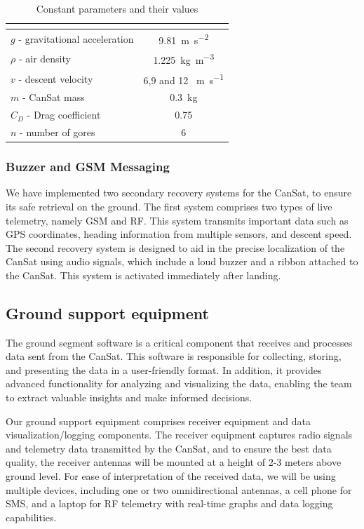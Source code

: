 \documentclass[11pt]{article}
\begin{document}
\begin{table}[htbp]
\centering
{}
\begin{tabular}{>{\centering\arraybackslash}lc}
\rowcolor{CDOSRPrimary}
\hline
\multicolumn{1}{|c|}{\textbf{\color{white!50}{Parameter}}}  & \textbf{\color{white!50}{Value}} \\
\hline
$g$ - gravitational acceleration & \SI{9.81 }{\meter\per\square\second} \\
\rowcolor{LightCyan1!50}$\rho$ - air density & \SI{1.225}{\kilogram\per\cubic\metre} \\
$v$ - descent velocity & 6,9 and 12 \SI{}{\meter\per\second} \\
\rowcolor{LightCyan1!50}$m$ - CanSat mass & \SI{0.3}{\kilogram} \\
$C_D$ - Drag coefficient & 0.75 \\
\rowcolor{LightCyan1!50}$n$ - number of gores & 6 \\
\hline
\end{tabular}
\caption{Constant parameters and their values}
\end{table}

\subsubsection{Buzzer and GSM Messaging}
We have implemented two secondary recovery systems for the CanSat, to ensure its safe retrieval on the ground. The first system comprises two types of live telemetry, namely GSM and RF. This system transmits important data such as GPS coordinates, heading information from multiple sensors, and descent speed. The second recovery system is designed to aid in the precise localization of the CanSat using audio signals, which include a loud buzzer and a ribbon attached to the CanSat. This system is activated immediately after landing.

\subsection{Ground support equipment}
The ground segment software is a critical component that receives and processes data sent from the CanSat. This software is responsible for collecting, storing, and presenting the data in a user-friendly format. In addition, it provides advanced functionality for analyzing and visualizing the data, enabling the team to extract valuable insights and make informed decisions.

Our ground support equipment comprises receiver equipment and data visualization/logging components. The receiver equipment captures radio signals and telemetry data transmitted by the CanSat, and to ensure the best data quality, the receiver antennas will be mounted at a height of 2-3 meters above ground level. For ease of interpretation of the received data, we will be using multiple devices, including one or two omnidirectional antennas, a cell phone for SMS, and a laptop for RF telemetry with real-time graphs and data logging capabilities.
\end{document}

